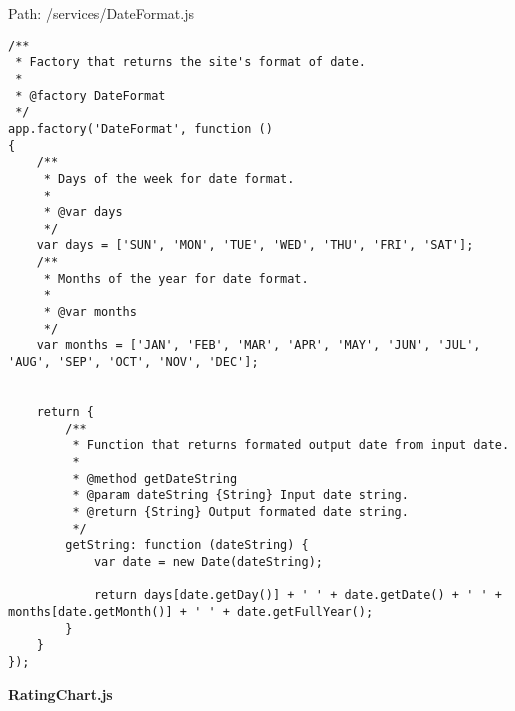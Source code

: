 Path: /services/DateFormat.js
{\scriptsize
\begin{lstlisting}
/**
 * Factory that returns the site's format of date.
 *
 * @factory DateFormat
 */
app.factory('DateFormat', function ()
{
	/**
	 * Days of the week for date format.
	 *
	 * @var days
	 */
	var days = ['SUN', 'MON', 'TUE', 'WED', 'THU', 'FRI', 'SAT'];
	/**
	 * Months of the year for date format.
	 *
	 * @var months
	 */
	var months = ['JAN', 'FEB', 'MAR', 'APR', 'MAY', 'JUN', 'JUL', 'AUG', 'SEP', 'OCT', 'NOV', 'DEC'];


	return {
		/**
		 * Function that returns formated output date from input date.
		 *
		 * @method getDateString
		 * @param dateString {String} Input date string.
		 * @return {String} Output formated date string.
		 */
		getString: function (dateString) {
			var date = new Date(dateString);

			return days[date.getDay()] + ' ' + date.getDate() + ' ' + months[date.getMonth()] + ' ' + date.getFullYear();
		}
	}
});\end{lstlisting}
}
\textbf{RatingChart.js}

